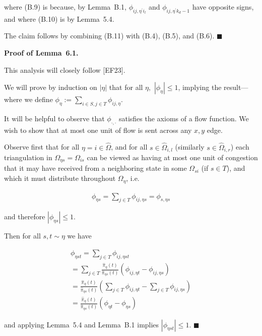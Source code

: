 \documentclass[10pt,a4paper]{article}
\begin{document}
where (B.9) is because, by Lemma B.1, $\phi_{ij,\eta^{\prime}i_{l}}$ and $\phi_{ij,\eta^{\prime}k_{d}-1}$ have opposite signs, and where (B.10) is by Lemma 5.4.\par




The claim follows by combining (B.11) with (B.4), (B.5), and (B.6).
\ensuremath{\blacksquare}\par





\par\medskip\noindent\textbf{Proof of Lemma 6.1.}\par



This analysis will closely follow [EF23].\par




We will prove by induction on $|\eta|$ that for all $\eta,$ $|\phi_{\eta}|\leq 1$, implying the result—where we define $\phi_{\eta}:=\sum_{i\in S,j\in T}\phi_{ij,\eta}$.\par




It will be helpful to observe that $\phi_{\cdot,\cdot}$ satisfies the axioms of a flow function. We wish to show that at most one unit of flow is sent across any $x,y$ edge.\par




Observe first that for all $\eta=i\in\hat{\Omega}$, and for all $s\in\hat{\Omega}_{i,l}$ (similarly $s\in\hat{\Omega}_{i,r}$) each triangulation in $\Omega_{\eta s}=\Omega_{is}$ can be viewed as having at most one unit of congestion that it may have received from a neighboring state in some $\Omega_{si}$ (if $s\in T$), and which it must distribute throughout $\Omega_{\eta}$, i.e.\par


\[\begin{gathered}
\phi_{\eta s}=\sum_{j\in T}\phi_{ij,\eta s}=\phi_{s,\eta s}
\end{gathered}\]


and therefore $|\phi_{\eta s}|\leq 1$.\par




Then for all $s,t\sim\eta$ we have\par


\[\begin{gathered}
\displaystyle\phi_{\eta st} \displaystyle=\sum_{j\in T}\phi_{ij,\eta st} \\
\displaystyle=\sum_{j\in T}\frac{\hat{\pi}_{\eta}(t)}{\hat{\pi}_{\eta s}(t)}(\phi_{ij,\eta t}-\phi_{ij,\eta s}) \\
\displaystyle=\frac{\hat{\pi}_{\eta}(t)}{\hat{\pi}_{\eta s}(t)}(\sum_{j\in T}\phi_{ij,\eta t}-\sum_{j\in T}\phi_{ij,\eta s}) \\
\displaystyle=\frac{\hat{\pi}_{\eta}(t)}{\hat{\pi}_{\eta s}(t)}(\phi_{\eta t}-\phi_{\eta s})
\end{gathered}\]


and applying Lemma 5.4 and Lemma B.1 implies $|\phi_{\eta st}|\leq 1$.
\ensuremath{\blacksquare}\par
\end{document}
